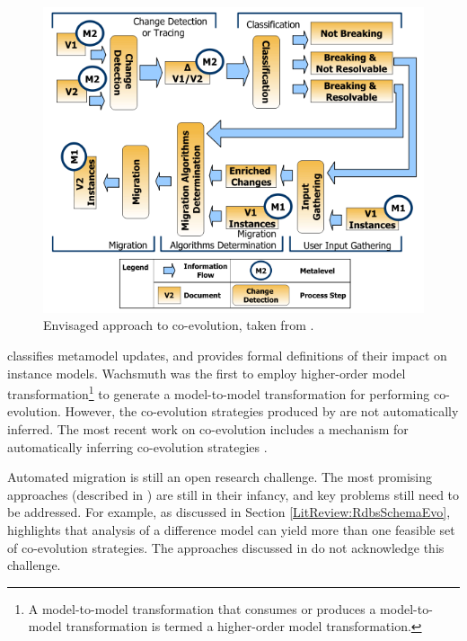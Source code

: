 \begin{figure}[htbp]
  \begin{center}
    \leavevmode
    \includegraphics[scale=0.6]{3.LiteratureReview/images/CoEvoProcess.png}
  \end{center}
  \caption{Envisaged approach to co-evolution, taken from \cite{gruschko07towards}.}
  \label{fig:coevoprocess}
\end{figure}

\cite{wachsmuth07metamodel} classifies metamodel updates, and provides formal definitions of their impact on instance models. Wachsmuth was the first to employ higher-order model transformation\footnote{A model-to-model transformation that consumes or produces a model-to-model transformation is termed a higher-order model transformation.} to generate a model-to-model transformation for performing co-evolution. However, the co-evolution strategies produced by \cite{wachsmuth07metamodel} are not automatically inferred. The most recent work on co-evolution includes a mechanism for automatically inferring co-evolution strategies \cite{cicchetti08automating}.

Automated migration is still an open research challenge. The most promising approaches (described in \cite{wachsmuth07metamodel,cicchetti08automating}) are still in their infancy, and key problems still need to be addressed. For example, as discussed in Section \ref{LitReview:RdbsSchemaEvo}, \cite{lerner00model} highlights that analysis of a difference model can yield more than one feasible set of co-evolution strategies. The approaches discussed in \cite{wachsmuth07metamodel,cicchetti08automating} do not acknowledge this challenge.

